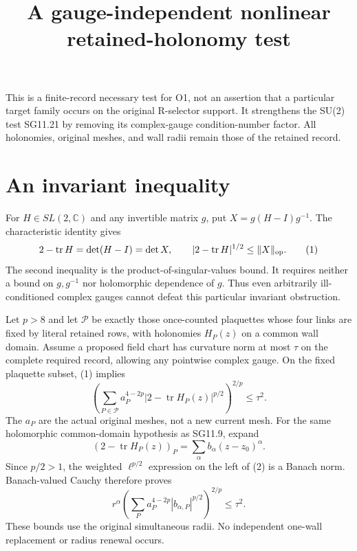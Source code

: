 \documentclass{article}
\title{A gauge-independent nonlinear retained-holonomy test}\author{}\date{}
\begin{document}
\maketitle
This is a finite-record necessary test for O1, not an assertion that a particular target family occurs on the original R-selector support. It strengthens the SU(2) test SG11.21 by removing its complex-gauge condition-number factor. All holonomies, original meshes, and wall radii remain those of the retained record.

\section{An invariant inequality}
For $H\in SL(2,\mathbb C)$ and any invertible matrix $g$, put $X=g(H-I)g^{-1}$. The characteristic identity gives
\[
 2-\operatorname{tr}H=\det(H-I)=\det X,\qquad
 |2-\operatorname{tr}H|^{1/2}\leq\|X\|_{\rm op}.
 \tag{1}
\]
The second inequality is the product-of-singular-values bound. It requires neither a bound on $g,g^{-1}$ nor holomorphic dependence of $g$. Thus even arbitrarily ill-conditioned complex gauges cannot defeat this particular invariant obstruction.

Let $p>8$ and let $\mathcal P$ be exactly those once-counted plaquettes whose four links are fixed by literal retained rows, with holonomies $H_P(z)$ on a common wall domain. Assume a proposed field chart has curvature norm at most $\tau$ on the complete required record, allowing any pointwise complex gauge. On the fixed plaquette subset, (1) implies
\[
 \left(\sum_{P\in\mathcal P}a_P^{4-2p}
 |2-\operatorname{tr}H_P(z)|^{p/2}\right)^{2/p}\leq\tau^2.
 \tag{2}
\]
The $a_P$ are the actual original meshes, not a new current mesh. For the same holomorphic common-domain hypothesis as SG11.9, expand
\[
 (2-\operatorname{tr}H_P(z))_P=\sum_\alpha b_\alpha(z-z_0)^\alpha.
\]
Since $p/2>1$, the weighted $\ell^{p/2}$ expression on the left of (2) is a Banach norm. Banach-valued Cauchy therefore proves
\[
 r^\alpha\left(\sum_Pa_P^{4-2p}|b_{\alpha,P}|^{p/2}\right)^{2/p}
 \leq\tau^2.
 \tag{3}
\]
These bounds use the original simultaneous radii. No independent one-wall replacement or radius renewal occurs.
\end{document}
